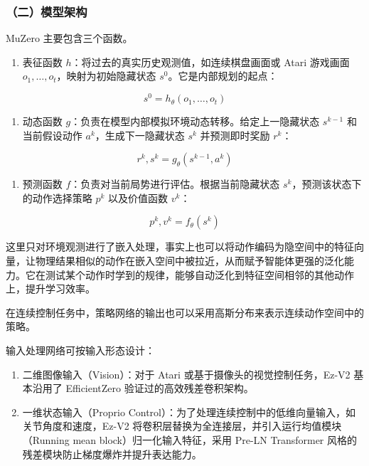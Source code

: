 \hypertarget{ux4e8cux6a21ux578bux67b6ux6784-5}{%
\subsubsection{（二）模型架构}\label{ux4e8cux6a21ux578bux67b6ux6784-5}}

MuZero 主要包含三个函数。

\begin{enumerate}
\def\labelenumi{\arabic{enumi}.}
\tightlist
\item
  表征函数 \(h\)：将过去的真实历史观测值，如连续棋盘画面或 Atari 游戏画面 \(o_1, \ldots, o_t\)，映射为初始隐藏状态 \(s^0\)。它是内部规划的起点：
\end{enumerate}

\[
s^0 = h_\theta(o_1, \ldots, o_t)
\]

\begin{enumerate}
\def\labelenumi{\arabic{enumi}.}
\setcounter{enumi}{1}
\tightlist
\item
  动态函数 \(g\)：负责在模型内部模拟环境动态转移。给定上一隐藏状态 \(s^{k-1}\) 和当前假设动作 \(a^k\)，生成下一隐藏状态 \(s^k\) 并预测即时奖励 \(r^k\)：
\end{enumerate}

\[
r^k, s^k = g_\theta(s^{k-1}, a^k)
\]

\begin{enumerate}
\def\labelenumi{\arabic{enumi}.}
\setcounter{enumi}{2}
\tightlist
\item
  预测函数 \(f\)：负责对当前局势进行评估。根据当前隐藏状态 \(s^k\)，预测该状态下的动作选择策略 \(p^k\) 以及价值函数 \(v^k\)：
\end{enumerate}

\[
p^k, v^k = f_\theta(s^k)
\]

这里只对环境观测进行了嵌入处理，事实上也可以将动作编码为隐空间中的特征向量，让物理结果相似的动作在嵌入空间中被拉近，从而赋予智能体更强的泛化能力。它在测试某个动作时学到的规律，能够自动泛化到特征空间相邻的其他动作上，提升学习效率。

在连续控制任务中，策略网络的输出也可以采用高斯分布来表示连续动作空间中的策略。

输入处理网络可按输入形态设计：

\begin{enumerate}
\def\labelenumi{\arabic{enumi}.}
\tightlist
\item
  二维图像输入（Vision）：对于 Atari 或基于摄像头的视觉控制任务，Ez-V2 基本沿用了 EfficientZero 验证过的高效残差卷积架构。
\item
  一维状态输入（Proprio Control）：为了处理连续控制中的低维向量输入，如关节角度和速度，Ez-V2 将卷积层替换为全连接层，并引入运行均值模块（Running mean block）归一化输入特征，采用 Pre-LN Transformer 风格的残差模块防止梯度爆炸并提升表达能力。
\end{enumerate}

